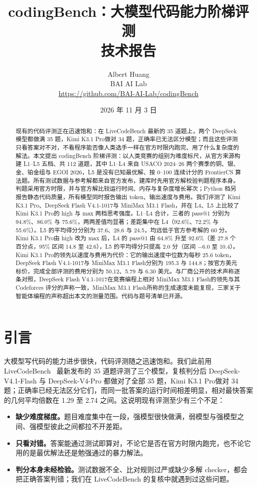 \documentclass[11pt,a4paper,fontset=none]{ctexart}
\title{\textbf{codingBench：大模型代码能力阶梯评测}\\[0.3em]\large 技术报告}
\author{Albert Huang\\BAI AI Lab\\\small\url{https://github.com/BAI-AI-Lab/codingBench}}
\date{2026 年 11 月 3 日}
\newcommand{\kimi}{Kimi K3.1 Pro}
\newcommand{\mini}{MiniMax M3.1 Flash}
\newcommand{\ds}{DeepSeek Flash V4.1-1017}
\newcommand{\lead}[1]{\textbf{#1}\quad}
\begin{document}
\maketitle

\begin{abstract}
现有的代码评测正在迅速饱和：在 LiveCodeBench 最新的 35 道题上，两个 DeepSeek 模型都做满 35 题，\kimi 做对 34 题，正确率已无法区分模型；而且这些评测只看答案对不对，不看程序能否像人类选手一样在官方时限内跑完、用了什么复杂度的解法。本文提出 codingBench 阶梯评测：以人类竞赛的组别为难度标尺，从官方来源构建 L1--L5 五档、共 112 道题，其中 L1--L4 来自 USACO 2024--26 两个赛季的铜、银、金、铂金组与 EGOI 2026，L5 是没有已知最优解、按 0--100 连续计分的 FrontierCS 算法题。所有测试数据与参考解都来自官方发布，建库时先用官方解校验判题程序本身。判题采用官方时限，并与官方解比较运行时间、内存与复杂度增长幂次；Python 档另报告静态代码质量，所有模型同时报告输出 token、输出速度与费用。我们评测了 \kimi、\ds 与 \mini，并在 L4、L5 上比较了 \kimi 的 high 与 max 两档思考强度。L1--L4 合计，三者的 pass@1 分别为 94.8\%、86.0\% 与 75.6\%，两两差值均显著；差距集中在 L4（92.6\%、72.2\% 与 55.6\%）。L5 的平均得分分别为 37.6、28.6 与 24.5，均远低于官方参考解的 60 分。\kimi 由 high 改为 max 后，L4 的 pass@1 由 64.8\% 升至 92.6\%（差 27.8 个百分点，95\% 区间 14.8 至 42.6），L5 的平均得分只提高 2.0 分（区间 $-$6.0 至 10.4）。\kimi 的领先以速度与费用为代价：它的输出速度中位数为每秒 25.6 token，\ds 与 \mini 分别为 195.3 与 144.8；按官方美元标价，完成全部评测的费用分别为 50.12、5.79 与 6.30 美元。与厂商公开的技术声称逐条对照，\ds 在竞赛编程上相对 \mini 的领先与其 Codeforces 评分的声称一致，\mini 所称的生成速度未能复现，三家关于智能体编程的声称超出本文的测量范围。代码与题号清单已开源。
\end{abstract}

\section{引言}

大模型写代码的能力进步很快，代码评测随之迅速饱和。我们此前用 LiveCodeBench~\cite{lcb} 最新发布的 35 道题评测了三个模型，复核判分后 DeepSeek-V4.1-Flash 与 DeepSeek-V4-Pro 都做对了全部 35 题，\kimi 做对 34 题；正确率已经无法区分它们，而同一批答案的运行时间相差明显，相对最快答案的几何平均倍数在 1.29 至 2.74 之间。这说明现有评测至少有三个不足：

\begin{itemize}[leftmargin=1.6em]
  \item \lead{缺少难度梯度。}题目难度集中在一段，强模型很快做满，弱模型与强模型之间、强模型彼此之间都拉不开差距。
  \item \lead{只看对错。}答案能通过测试即算对，不论它是否在官方时限内跑完，也不论它用的是最优解法还是勉强通过的暴力解法。
  \item \lead{判分本身未经检验。}测试数据不全、比对规则过严或缺少多解 checker，都会把正确答案判错；我们在 LiveCodeBench 的复核中就遇到过这些问题。
\end{itemize}
\end{document}
